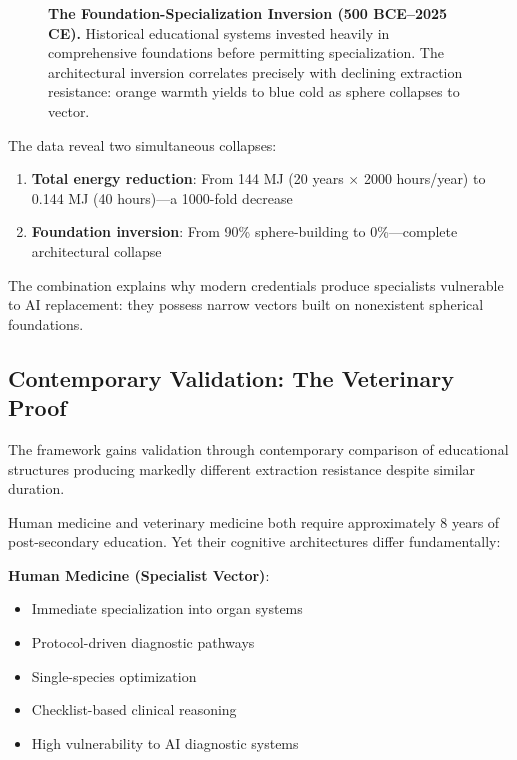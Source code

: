 \begin{figure}[htbp]
    \caption{\textbf{The Foundation-Specialization Inversion (500 BCE--2025 CE).} Historical educational systems invested heavily in comprehensive foundations before permitting specialization. The architectural inversion correlates precisely with declining extraction resistance: orange warmth yields to blue cold as sphere collapses to vector.}
    \label{fig:foundation-specialization}
\end{figure}

The data reveal two simultaneous collapses:

\begin{enumerate}
    \item \textbf{Total energy reduction}: From 144 MJ (20 years $\times$ 2000 hours/year) to 0.144 MJ (40 hours)---a 1000-fold decrease
    \item \textbf{Foundation inversion}: From 90\% sphere-building to 0\%---complete architectural collapse
\end{enumerate}

The combination explains why modern credentials produce specialists vulnerable to AI replacement: they possess narrow vectors built on nonexistent spherical foundations.

\subsection{Contemporary Validation: The Veterinary Proof}

The framework gains validation through contemporary comparison of educational structures producing markedly different extraction resistance despite similar duration.

Human medicine and veterinary medicine both require approximately 8 years of post-secondary education. Yet their cognitive architectures differ fundamentally:

\textbf{Human Medicine (Specialist Vector)}:
\begin{itemize}
    \item Immediate specialization into organ systems
    \item Protocol-driven diagnostic pathways
    \item Single-species optimization
    \item Checklist-based clinical reasoning
    \item High vulnerability to AI diagnostic systems
\end{itemize}

